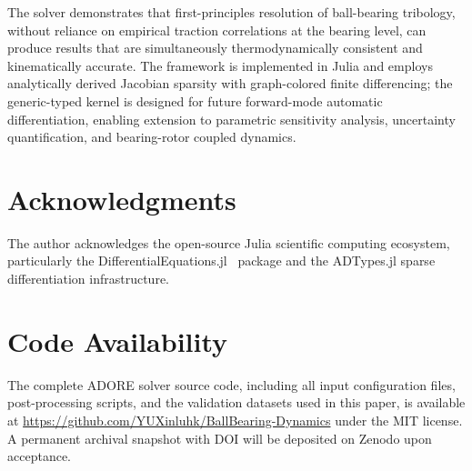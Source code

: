 \documentclass[preprint,12pt]{elsarticle}
\begin{document}
The solver demonstrates that first-principles resolution of ball-bearing tribology, without reliance on empirical traction correlations at the bearing level, can produce results that are simultaneously thermodynamically consistent and kinematically accurate. The framework is implemented in Julia and employs analytically derived Jacobian sparsity with graph-colored finite differencing; the generic-typed kernel is designed for future forward-mode automatic differentiation, enabling extension to parametric sensitivity analysis, uncertainty quantification, and bearing-rotor coupled dynamics.


\section*{Acknowledgments}

The author acknowledges the open-source Julia scientific computing ecosystem, particularly the DifferentialEquations.jl~\cite{Rackauckas2017} package and the ADTypes.jl sparse differentiation infrastructure.


\section*{Code Availability}

The complete ADORE solver source code, including all input configuration files, post-processing scripts, and the validation datasets used in this paper, is available at \url{https://github.com/YUXinluhk/BallBearing-Dynamics} under the MIT license. A permanent archival snapshot with DOI will be deposited on Zenodo upon acceptance.
\end{document}
